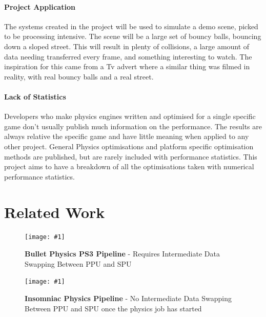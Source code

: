 \documentclass[conference]{acmsiggraph}
\newcommand{\figuremacroF}[4]{
	\begin{figure}[h] %
		\centering
		\texttt{[image: \#1]}
		\caption[#2]{\textbf{#2} - #3}
		\label{fig:#1}
	\end{figure}
}
\begin{document}
\paragraph{Project Application}
The systems created in the project will be used to simulate a demo scene, picked to be processing intensive. The scene will be a large set of bouncy balls, bouncing down a sloped street. This will result in plenty of collisions, a large amount of data needing transferred every frame, and something interesting to watch. The inspiration for this came from a Tv advert \cite{advert} where a similar thing was filmed in reality, with real bouncy balls and a real street.

\paragraph{Lack of Statistics}
Developers who make physics engines written and optimised for a single specific game don't usually publish much information on the performance. The results are always relative the specific game and have little meaning when applied to any other project. General Physics optimisations and platform specific optimisation methods are published, but are rarely included with performance statistics. This project aims to have a breakdown of all the optimisations taken with numerical performance statistics.

\section{Related Work}

\figuremacroF
{bullet}
{Bullet Physics PS3 Pipeline}
{Requires Intermediate Data Swapping Between PPU and SPU \protect\cite{spuphys}}
{0.96}
\figuremacroF
{insomniac}
{Insomniac Physics Pipeline}
{No Intermediate Data Swapping Between PPU and SPU once the physics job has started \protect\cite{spuphys}}
{0.96}
\end{document}

